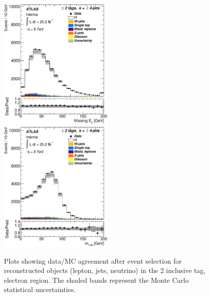\begin{figure}[!hb]
\begin{center}
		\includegraphics[height=65mm]{chapters/whel/figures/control_Plots2/bTag_2incl/MissingEt_el}
        \includegraphics[height=65mm]{chapters/whel/figures/control_Plots2/bTag_2incl/TransverseMass_el}
	\caption{Plots showing data/MC agreement after event selection for reconstructed objects (lepton, jets, neutrino) in the 2 inclusive \bt tag, electron region. The shaded bands represent the Monte Carlo statistical uncertainties.}
	\label{fig:control_plots_el_2incl}
	\end{center}
	\end{figure}
	

